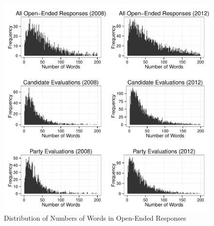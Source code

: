 \documentclass[12pt]{article}
\begin{document}
\begin{figure}[ht]\centering
\includegraphics[scale=.6]{../calc/fig/a0_num.pdf}
\caption{Distribution of Numbers of Words in Open-Ended Responses}\label{fig:a0_num}
\end{figure}




\end{document}
